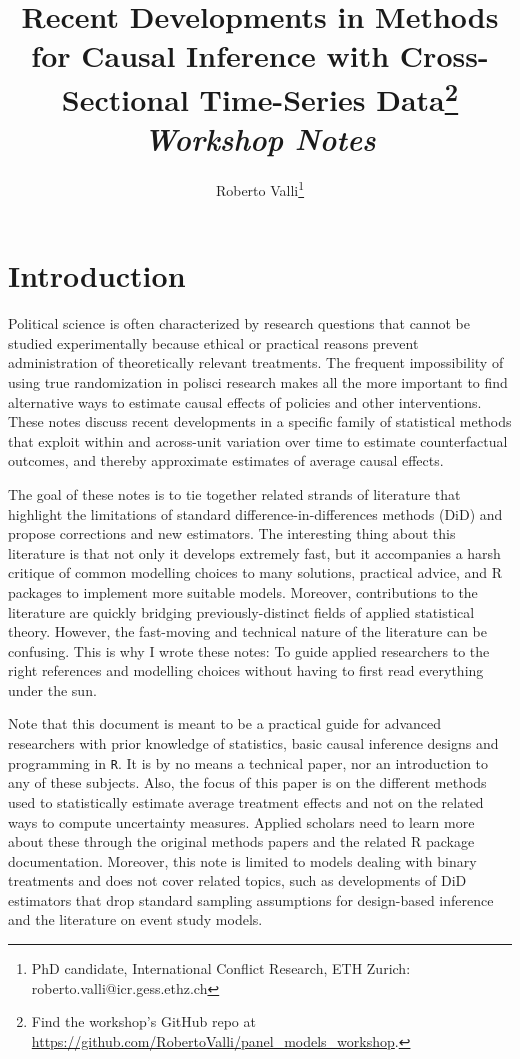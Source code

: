 \documentclass[hidelinks]{article}\usepackage[]{graphicx}\usepackage[]{color}
\author{
	Roberto Valli\thanks{PhD candidate, International Conflict Research, ETH Zurich: roberto.valli@icr.gess.ethz.ch} 
}
\title{
	 Recent Developments in Methods for Causal Inference with Cross-Sectional Time-Series Data\thanks{Find the workshop's GitHub repo at \url{https://github.com/RobertoValli/panel_models_workshop}.}\\[1em]
	 \textit{Workshop Notes}
}
\begin{document}
\maketitle

\section{Introduction}

Political science is often characterized by research questions that cannot be studied experimentally because ethical or practical reasons prevent administration of theoretically relevant treatments. The frequent impossibility of using true randomization in polisci research makes all the more important to find alternative ways to estimate causal effects of policies and other interventions. These notes discuss recent developments in a specific family of statistical methods that exploit within and across-unit variation over time to estimate counterfactual outcomes, and thereby approximate estimates of average causal effects. 

The goal of these notes is to tie together related strands of literature that highlight the limitations of standard difference-in-differences methods (DiD) and propose corrections and new estimators. The interesting thing about this literature is that not only it develops extremely fast, but it accompanies a harsh critique of common modelling choices to many solutions, practical advice, and R packages to implement more suitable models. Moreover, contributions to the literature are quickly bridging previously-distinct fields of applied statistical theory. However, the fast-moving and technical nature of the literature can be confusing. This is why I wrote these notes: To guide applied researchers to the right references and modelling choices without having to first read everything under the sun.

Note that this document is meant to be a practical guide for advanced researchers with prior knowledge of statistics, basic causal inference designs and programming in \texttt{R}. It is by no means a technical paper, nor an introduction to any of these subjects. Also, the focus of this paper is on the different methods used to statistically estimate average treatment effects and not on the related ways to compute uncertainty measures. Applied scholars need to learn more about these through the original methods papers and the related R package documentation. Moreover, this note is limited to models dealing with binary treatments and does not cover related topics, such as developments of DiD estimators that drop standard sampling assumptions for design-based inference and the literature on event study models.
\end{document}
